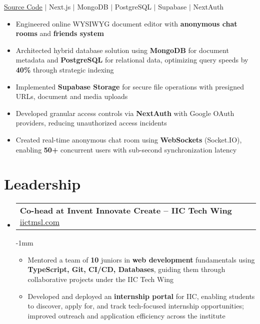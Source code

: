 \documentclass[letterpaper,11pt]{article}
\makeatletter
\newcommand{\resumeItem}[1]{
  \item\small{
    {#1 \vspace{0pt}}
  }
}
\newcommand{\resumeProjectHeading}[2]{
    \item
    \begin{tabular*}{1.001\textwidth}{l@{\extracolsep{\fill}}r}
      \small#1 & \textbf{\small #2}\\
    \end{tabular*}\vspace{-7pt}
}
\newcommand{\resumeSubHeadingListStart}{\begin{itemize}[leftmargin=0.0in, label={}]}
\newcommand{\resumeSubHeadingListEnd}{\end{itemize}}\vspace{0pt}
\newcommand{\resumeItemListStart}{\begin{itemize}}
\newcommand{\resumeItemListEnd}{\end{itemize}\vspace{-5pt}}
\makeatother
\begin{document}
        
        \href{https://github.com/abhraneeldhar7/nebula}{\color{blue}\underline{Source Code}} $|$
        {Next.js $|$ MongoDB $|$ PostgreSQL $|$ Supabase $|$ NextAuth}
        
        \resumeItemListStart
            \resumeItem{Engineered online WYSIWYG document editor with \textbf{anonymous chat rooms} and \textbf{friends system}}
            \resumeItem{Architected hybrid database solution using \textbf{MongoDB} for document metadata and \textbf{PostgreSQL} for relational data, optimizing query speeds by \textbf{40\%} through strategic indexing}
            \resumeItem{Implemented \textbf{Supabase Storage} for secure file operations with presigned URLs, document and media uploads}
            \resumeItem{Developed granular access controls via \textbf{NextAuth} with Google OAuth providers, reducing unauthorized access incidents}
            \resumeItem{Created real-time anonymous chat room using \textbf{WebSockets} (Socket.IO), enabling \textbf{50+} concurrent users with sub-second synchronization latency}
        \resumeItemListEnd


\vspace{-15pt}
\section{Leadership} 
    \vspace{-10pt}
    \resumeSubHeadingListStart
\resumeProjectHeading
  {\textbf{Co-head at Invent Innovate Create -- IIC Tech Wing} \href{https://www.iictmsl.com}{\color{blue}\underline{iictmsl.com}}}
    
    \vspace{-1mm}
    
          \resumeItemListStart
            \resumeItem{Mentored a team of \textbf{10} juniors in \textbf{web development} fundamentals using \textbf{TypeScript, Git, CI/CD, Databases}, guiding them through collaborative projects under the IIC Tech Wing}

         \resumeItem{Developed and deployed an \textbf{internship portal} for IIC, enabling students to discover, apply for, and track tech-focused internship opportunities; improved outreach and application efficiency across the institute}

          \resumeItemListEnd
          \resumeSubHeadingListEnd
 \vspace{-12pt}
\end{document}

